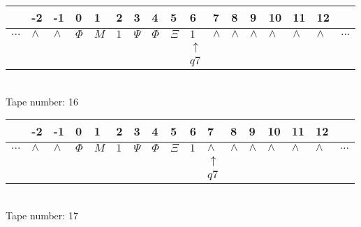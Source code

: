 \documentclass{article}
\begin{document}
\begin{table}[H]
\centering
\begin{tabular}{lllllllllllllllll}
 & -2 & -1 & 0 & 1 & 2 & 3 & 4 & 5 & 6 & 7 & 8 & 9 & 10 & 11 & 12 & \\
\hline
$...$ & \multicolumn{1}{|l|}{$\wedge$} & \multicolumn{1}{|l|}{$\wedge$} & \multicolumn{1}{|l|}{$\Phi$} & \multicolumn{1}{|l|}{$M$} & \multicolumn{1}{|l|}{$1$} & \multicolumn{1}{|l|}{$\Psi$} & \multicolumn{1}{|l|}{$\Phi$} & \multicolumn{1}{|l|}{$\Xi$} & \multicolumn{1}{|l|}{$1$} & \multicolumn{1}{|l|}{$\wedge$} & \multicolumn{1}{|l|}{$\wedge$} & \multicolumn{1}{|l|}{$\wedge$} & \multicolumn{1}{|l|}{$\wedge$} & \multicolumn{1}{|l|}{$\wedge$} & \multicolumn{1}{|l|}{$\wedge$} & $...$\\
\hline
&  &  &  &  &  &  &  &  & $\uparrow$ &  &  &  &  &  &  &  \\
&  &  &  &  &  &  &  &  & $ q7 $ &  &  &  &  &  &  &  \\
\end{tabular}
\\
Tape number: 16
\noindent\makebox[\linewidth]{\hdashrule{\textwidth}{1pt}{1pt}}\end{table}

\begin{table}[H]
\centering
\begin{tabular}{lllllllllllllllll}
 & -2 & -1 & 0 & 1 & 2 & 3 & 4 & 5 & 6 & 7 & 8 & 9 & 10 & 11 & 12 & \\
\hline
$...$ & \multicolumn{1}{|l|}{$\wedge$} & \multicolumn{1}{|l|}{$\wedge$} & \multicolumn{1}{|l|}{$\Phi$} & \multicolumn{1}{|l|}{$M$} & \multicolumn{1}{|l|}{$1$} & \multicolumn{1}{|l|}{$\Psi$} & \multicolumn{1}{|l|}{$\Phi$} & \multicolumn{1}{|l|}{$\Xi$} & \multicolumn{1}{|l|}{$1$} & \multicolumn{1}{|l|}{$\wedge$} & \multicolumn{1}{|l|}{$\wedge$} & \multicolumn{1}{|l|}{$\wedge$} & \multicolumn{1}{|l|}{$\wedge$} & \multicolumn{1}{|l|}{$\wedge$} & \multicolumn{1}{|l|}{$\wedge$} & $...$\\
\hline
&  &  &  &  &  &  &  &  &  & $\uparrow$ &  &  &  &  &  &  \\
&  &  &  &  &  &  &  &  &  & $ q7 $ &  &  &  &  &  &  \\
\end{tabular}
\\
Tape number: 17
\noindent\makebox[\linewidth]{\hdashrule{\textwidth}{1pt}{1pt}}\end{table}
\clearpage
\end{document}
